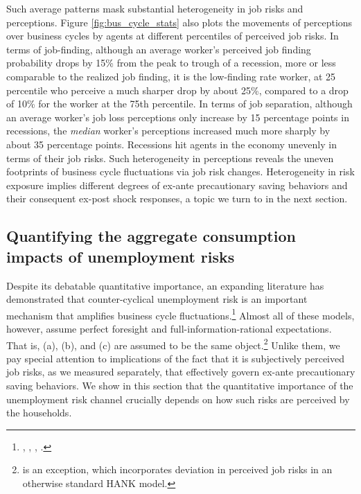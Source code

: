 Such average patterns mask substantial heterogeneity in job risks and perceptions. Figure \ref{fig:bus_cycle_stats} also plots the movements of perceptions over business cycles by agents at different percentiles of perceived job risks. In terms of job-finding, although an average worker's perceived job finding probability drops by 15\% from the peak to trough of a recession, more or less comparable to the realized job finding, it is the low-finding rate worker, at 25 percentile who perceive a much sharper drop by about 25\%, compared to a drop of 10\% for the worker at the 75th percentile. In terms of job separation, although an average worker's job loss perceptions only increase by 15 percentage points in recessions, the \emph{median} worker's perceptions increased much more sharply by about 35 percentage points. Recessions hit agents in the economy unevenly in terms of their job risks. Such heterogeneity in perceptions reveals the uneven footprints of business cycle fluctuations via job risk changes. Heterogeneity in risk exposure implies different degrees of ex-ante precautionary saving behaviors and their consequent ex-post shock responses, a topic we turn to in the next section. 




\subsection{Quantifying the aggregate consumption impacts of unemployment risks}

Despite its debatable quantitative importance, an expanding literature has demonstrated that counter-cyclical unemployment risk is an important mechanism that amplifies business cycle fluctuations.\footnote{\cite{challe2016precautionary}, \cite{mckay2017time}, \cite{bayer2019precautionary}, \cite{ravn2021macroeconomic}.} Almost all of these models, however, assume perfect foresight and full-information-rational expectations. That is, (a), (b), and (c) are assumed to be the same object.\footnote{\cite{bardoczy2023unemployment} is an exception, which incorporates deviation in perceived job risks in an otherwise standard HANK model.} Unlike them, we pay special attention to implications of the fact that it is subjectively perceived job risks, as we measured separately, that effectively govern ex-ante precautionary saving behaviors. We show in this section that the quantitative importance of the unemployment risk channel crucially depends on how such risks are perceived by the households. 

